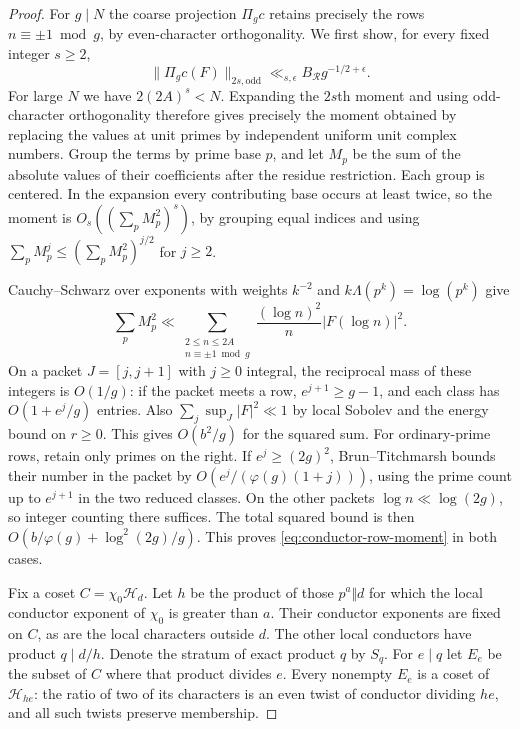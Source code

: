 \documentclass[11pt,a4paper]{article}
\numberwithin{equation}{section}
\begin{document}
\begin{proof}
For $g\mid N$ the coarse projection $\Pi_g c$ retains precisely
the rows $n\equiv\pm1\bmod g$, by even-character orthogonality.
We first show, for every fixed integer $s\ge2$,
\begin{equation}
 \|\Pi_g c(F)\|_{2s,\mathrm{odd}}
 \ll_{s,\epsilon} B_{\mathcal R}g^{-1/2+\epsilon}.
 \label{eq:conductor-row-moment}
\end{equation}
For large $N$ we have $2(2A)^s<N$. Expanding the $2s$th moment
and using odd-character orthogonality therefore gives precisely
the moment obtained by replacing the values at unit primes by
independent uniform unit complex numbers. Group the terms by
prime base $p$, and let $M_p$ be the sum of the absolute values
of their coefficients after the residue restriction. Each group
is centered. In the expansion every contributing base occurs at
least twice, so the moment is $O_s((\sum_p M_p^2)^s)$, by grouping
equal indices and using $\sum_p M_p^j\le(\sum_p M_p^2)^{j/2}$
for $j\ge2$.

Cauchy--Schwarz over exponents with weights $k^{-2}$ and
$k\Lambda(p^k)=\log(p^k)$ give
\[
 \sum_p M_p^2\ll
 \sum_{\substack{2\le n\le2A\\n\equiv\pm1\bmod g}}
       \frac{(\log n)^2}{n}|F(\log n)|^2 .
\]
On a packet $J=[j,j+1]$ with $j\ge0$ integral, the reciprocal
mass of these integers is $O(1/g)$: if the packet meets a row,
$e^{j+1}\ge g-1$, and each class has $O(1+e^j/g)$ entries.
Also $\sum_j\sup_J|F|^2\ll1$ by local Sobolev and the energy
bound on $r\ge0$. This gives $O(b^2/g)$ for the squared sum.
For ordinary-prime rows, retain only primes on the right. If
$e^j\ge(2g)^2$, Brun--Titchmarsh \cite{MontgomeryVaughanSieve}
bounds their number in the packet by $O(e^j/(\varphi(g)(1+j)))$,
using the prime count up to $e^{j+1}$ in the two reduced classes.
On the other packets $\log n\ll\log(2g)$, so integer counting
there suffices. The total squared bound is then
$O(b/\varphi(g)+\log^2(2g)/g)$. This proves
\eqref{eq:conductor-row-moment} in both cases.

Fix a coset $C=\chi_0\mathcal H_d$. Let $h$ be the product of
those $p^a\Vert d$ for which the local conductor exponent of
$\chi_0$ is greater than $a$. Their conductor exponents are fixed
on $C$, as are the local characters outside $d$. The other local
conductors have product $q\mid d/h$. Denote the stratum of exact
product $q$ by $S_q$. For $e\mid q$ let $E_e$ be the subset of
$C$ where that product divides $e$. Every nonempty $E_e$ is a
coset of $\mathcal H_{he}$: the ratio of two of its characters
is an even twist of conductor dividing $he$, and all such twists
preserve membership.


\end{proof}
\end{document}
